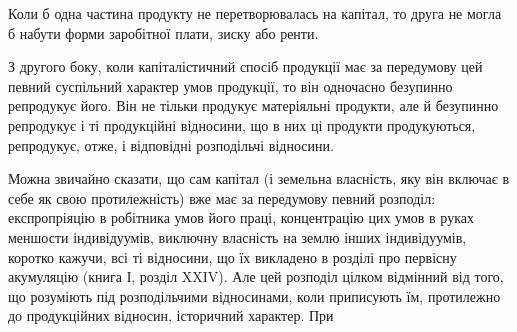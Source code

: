 Коли б одна частина продукту не перетворювалась на капітал, то друга
не могла б набути форми заробітної плати, зиску або ренти.

З другого боку, коли капіталістичний спосіб продукції має за передумову цей
певний суспільний характер умов продукції, то він одночасно безупинно репродукує
його. Він не тільки продукує матеріяльні продукти, але й безупинно репродукує
і ті продукційні відносини, що в них ці продукти продукуються,
репродукує, отже, і відповідні розподільчі відносини.

Можна звичайно сказати, що сам капітал (і земельна власність, яку
він включає в себе як свою протилежність) вже має за передумову певний
розподіл: експропріяцію в робітника умов його праці, концентрацію
цих умов в руках меншости індивідуумів, виключну власність на землю
інших індивідуумів, коротко кажучи, всі ті відносини, що їх викладено в розділі
про первісну акумуляцію (книга І, розділ XXIV). Але цей розподіл цілком
відмінний від того, що розуміють під розподільчими відносинами, коли приписують
їм, протилежно до продукційних відносин, історичний характер. При